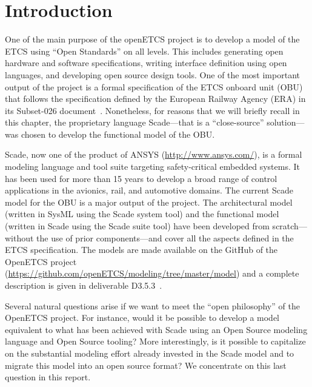 \documentclass{template/openetcs_report}
\begin{document}

\mainmatter


\chapter{Introduction}
\label{cha:introduction}

One of the main purpose of the openETCS project is to develop a model
of the ETCS using ``Open Standards'' on all levels. This includes
generating open hardware and software specifications, writing
interface definition using open languages, and developing open source
design tools. One of the most important output of the project is a
formal specification of the ETCS onboard unit (OBU) that follows the
specification defined by the European Railway Agency (ERA) in its
Subset-026 document~\cite{subset-026}. Nonetheless, for reasons that
we will briefly recall in this chapter, the proprietary language
Scade---that is a ``close-source'' solution---was chosen to develop
the functional model of the OBU.

Scade, now one of the product of ANSYS (\url{http://www.ansys.com/}),
is a formal modeling language and tool suite targeting safety-critical
embedded systems. It has been used for more than 15 years to develop a
broad range of control applications in the avionics, rail, and
automotive domains. The current Scade model for the OBU is a major
output of the project. The architectural model (written in SysML using
the Scade system tool) and the functional model (written in Scade
using the Scade suite tool) have been developed from scratch---without
the use of prior components---and cover all the aspects defined in the
ETCS specification. The models are made available on the GitHub of the
OpenETCS project
(\url{https://github.com/openETCS/modeling/tree/master/model}) and a
complete description is given in deliverable D3.5.3~\cite{d353}.

Several natural questions arise if we want to meet the ``open
philosophy'' of the OpenETCS project. For instance, would it be
possible to develop a model equivalent to what has been achieved with
Scade using an Open Source modeling language and Open Source tooling?
More interestingly, is it possible to capitalize on the substantial
modeling effort already invested in the Scade model and to migrate
this model into an open source format?  We concentrate on this last
question in this report.
\end{document}
